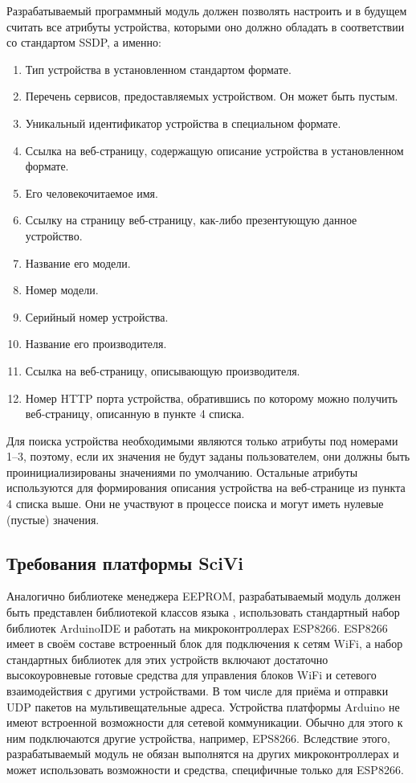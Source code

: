 Разрабатываемый программный модуль должен позволять настроить и в будущем считать все атрибуты устройства, которыми оно должно обладать в соответствии со стандартом SSDP, а именно:
\begin{enumerate}
	\item Тип устройства в установленном стандартом формате.
	\item Перечень сервисов, предоставляемых устройством.
	Он может быть пустым.
	\item Уникальный идентификатор устройства в специальном формате.
	\item Ссылка на веб-страницу, содержащую описание устройства в установленном формате.
	\item Его человекочитаемое имя.
	\item Ссылку на страницу веб-страницу, как-либо презентующую данное устройство.
	\item Название его модели.
	\item Номер модели.
	\item Серийный номер устройства.
	\item Название его производителя.
	\item Ссылка на веб-страницу, описывающую производителя.
	\item Номер HTTP порта устройства, обратившись по которому можно получить веб-страницу, описанную в пункте 4 списка.
\end{enumerate}

Для поиска устройства необходимыми являются только атрибуты под номерами 1--3, поэтому, если их значения не будут заданы пользователем, они должны быть проинициализированы значениями по умолчанию.
Остальные атрибуты используются для формирования описания устройства на веб-странице из пункта 4 списка выше.
Они не участвуют в процессе поиска и могут иметь нулевые (пустые) значения.

\subsection{Требования платформы SciVi}

Аналогично библиотеке менеджера EEPROM, разрабатываемый модуль должен быть представлен библиотекой классов языка \CPP, использовать стандартный набор библиотек ArduinoIDE и работать на микроконтроллерах ESP8266.
ESP8266 имеет в своём составе встроенный блок для подключения к сетям WiFi, а набор стандартных библиотек для этих устройств включают достаточно высокоуровневые готовые средства для управления блоков WiFi и сетевого взаимодействия с другими устройствами.
В том числе для приёма и отправки UDP пакетов на мультивещательные адреса.
Устройства платформы Arduino не имеют встроенной возможности для сетевой коммуникации.
Обычно для этого к ним подключаются другие устройства, например, EPS8266.
Вследствие этого, разрабатываемый модуль не обязан выполнятся на других микроконтроллерах и может использовать возможности и средства, специфичные только для ESP8266.

